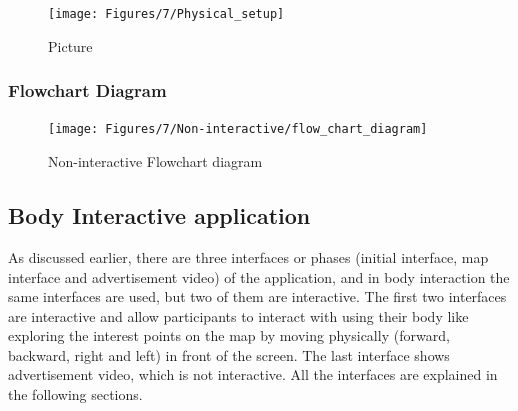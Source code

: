 \begin{figure}[H]
    \centering
    \texttt{[image: Figures/7/Physical\_setup]}
    \caption{Picture}%
    \label{fig:hardwaresetup}%
\end{figure}



\subsubsection{Flowchart Diagram}

\begin{figure}[H]
    \centering
    \texttt{[image: Figures/7/Non-interactive/flow\_chart\_diagram]}
    \caption{Non-interactive Flowchart diagram}%
    \label{fig:non_inter_flowchart}%
\end{figure}
\fi


\subsection{Body Interactive application}
As discussed earlier, there are three interfaces or phases (initial interface, map interface and advertisement video) of the application, and in body interaction the same interfaces are used, but two of them are interactive. The first two interfaces are interactive and allow participants to interact with using their body like exploring the interest points on the map by moving physically (forward, backward, right and left) in front of the screen. The last interface shows advertisement video, which is not interactive.  All the interfaces are explained in the following sections.

